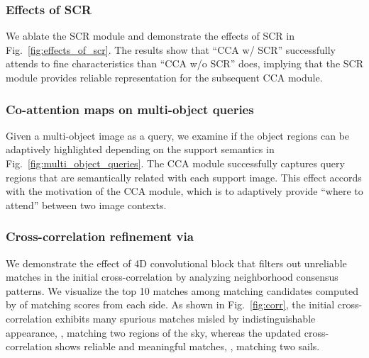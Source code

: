 \documentclass[10pt,twocolumn,letterpaper]{article}
\newcommand{\abbself}{SCR\xspace}
\newcommand{\abbcross}{CCA\xspace}
\begin{document}
\subsubsection{Effects of \abbself}
We ablate the \abbself module and demonstrate the effects of \abbself in Fig.~\ref{fig:effects_of_scr}.
The results show that ``CCA w/ SCR'' successfully attends to fine characteristics than ``CCA w/o SCR'' does, implying that the \abbself module provides reliable representation for the subsequent \abbcross module.








\subsubsection{Co-attention maps on multi-object queries}
Given a multi-object image as a query, we examine if the object regions can be adaptively highlighted depending on the support semantics in Fig.~\ref{fig:multi_object_queries}.
The \abbcross module successfully captures query regions that are semantically related with each support image.
This effect accords with the motivation of the \abbcross module, which is to adaptively provide ``where to attend'' between two image contexts.








\subsubsection{Cross-correlation refinement via }
We demonstrate the effect of 4D convolutional block  that filters out unreliable matches in the initial cross-correlation by analyzing neighborhood consensus patterns.
We visualize the top 10 matches among  matching candidates computed by  of matching scores from each side.
As shown in Fig.~\ref{fig:corr}, the initial cross-correlation  exhibits many spurious matches misled by indistinguishable appearance, \eg, matching two regions of the sky, whereas the updated cross-correlation  shows reliable and meaningful matches, \eg, matching two sails. 
\end{document}
